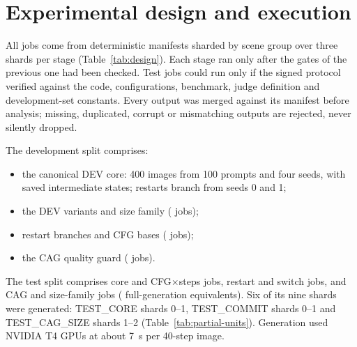 \section{Experimental design and execution}\label{sec:design}
All jobs come from deterministic manifests sharded by scene group over three shards per stage (Table~\ref{tab:design}). Each stage ran only after the gates of the previous one had been checked. Test jobs could run only if the signed protocol verified against the code, configurations, benchmark, judge definition and development-set constants. Every output was merged against its manifest before analysis; missing, duplicated, corrupt or mismatching outputs are rejected, never silently dropped.

The development split comprises:
\begin{itemize}
\item the canonical DEV core: 400 images from 100 prompts and four seeds, with saved intermediate states; restarts branch from seeds 0 and 1;
\item the DEV variants and size family (\devCoreJobs{} jobs);
\item restart branches and CFG bases (\devCommitJobs{} jobs);
\item the CAG quality guard (\devCagJobs{} jobs).
\end{itemize}
The test split comprises \testCoreJobs{} core and CFG$\times$steps jobs, \testCommitJobs{} restart and switch jobs, and \testCagJobs{} CAG and size-family jobs (\testEq{} full-generation equivalents). Six of its nine shards were generated: TEST\_CORE shards 0--1, TEST\_COMMIT shards 0--1 and TEST\_CAG\_SIZE shards 1--2 (Table~\ref{tab:partial-units}). Generation used NVIDIA T4 GPUs at about 7~s per 40-step image.

